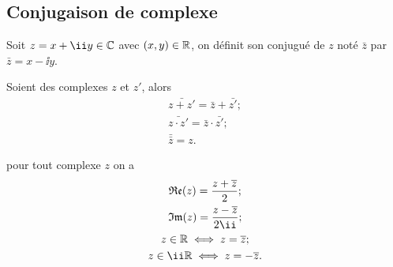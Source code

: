 \subsection{Conjugaison de complexe}
\label{subsec:conjugaisoncomplexe}
\begin{defdef}
  Soit $z=x+\ii y \in \C$ avec $(x,y)\in \mathbb{R}$, on définit son conjugué de $z$ noté $\bar{z}$ par $\bar{z}=x- \ii y$.
\end{defdef}
\begin{prop} 
  Soient des complexes $z$ et $z'$, alors
  \begin{gather} 
    \bar{z+z'}=\bar{z} + \bar{z'}; \\ 
    \bar{z \cdot z'}=\bar{z} \cdot \bar{z'}; \\ 
    \bar{\bar{z}}=z.
  \end{gather}
\end{prop}
\begin{prop}
  pour tout complexe $z$ on a 
  \begin{gather}
    \Re(z)=\frac{z+\bar{z}}{2};\\ 
    \Im(z)=\frac{z-\bar{z}}{2 \ii};\\
    z \in \R \iff z=\bar{z};\\  
    z \in \ii\R \iff z=-\bar{z}.
  \end{gather}
\end{prop}
%
